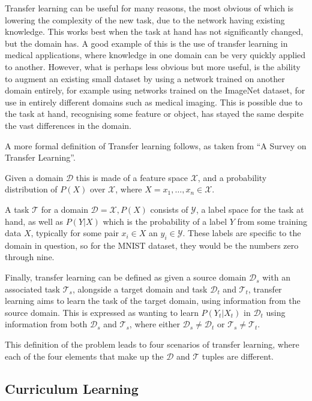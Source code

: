 Transfer learning can be useful for many reasons, the most obvious of which is
lowering the complexity of the new task, due to the network having existing
knowledge. This works best when the task at hand has not significantly changed,
but the domain has. A good example of this is the use of transfer learning in
medical applications, where knowledge in one domain can be very quickly applied
to another\cite{van2015transfer}. However, what is perhaps less obvious but more
useful, is the ability to augment an existing small dataset by using a network
trained on another domain entirely, for example using networks trained on the
ImageNet dataset\cite{ILSVRC15}, for use in entirely different domains such as
medical imaging\cite{shin2016deep, tajbakhsh2016convolutional}. This is possible
due to the task at hand, recognising some feature or object, has stayed the same
despite the vast differences in the domain.

A more formal definition of Transfer learning follows, as taken from ``A
Survey on Transfer Learning''\cite{pan2010survey}.

Given a domain $\mathcal{D}$ this is made of a feature space $\mathcal{X}$, and a
probability distribution of $P(X)$ over $\mathcal{X}$, where $X = x_1, \ldots,
x_n \in \mathcal{X}$.

A task $\mathcal{T}$ for a domain $\mathcal{D} = {\mathcal{X}, P(X)}$ consists
of $\mathcal{Y}$, a label space for the task at hand, as well as $P(Y|X)$ which
is the probability of a label $Y$ from some training data $X$, typically for
some pair $x_i \in X$ an $y_i \in \mathcal{Y}$. These labels are specific to the
domain in question, so for the MNIST dataset, they would be the numbers zero
through nine.

Finally, transfer learning can be defined as given a source domain
$\mathcal{D}_s$ with an associated task $\mathcal{T}_s$, alongside a target
domain and task $\mathcal{D}_t$ and $\mathcal{T}_t$, transfer learning aims to
learn the task of the target domain, using information from the source domain.
This is expressed as wanting to learn $P(Y_t | X_t)$ in $\mathcal{D}_t$ using
information from both $\mathcal{D}_s$ and $\mathcal{T}_s$, where either
$\mathcal{D}_s \ne \mathcal{D}_t$ or $\mathcal{T}_s \ne \mathcal{T}_t$.

This definition of the problem leads to four scenarios of transfer learning,
where each of the four elements that make up the $\mathcal{D}$ and $\mathcal{T}$
tuples are different.

\subsection{Curriculum Learning}

